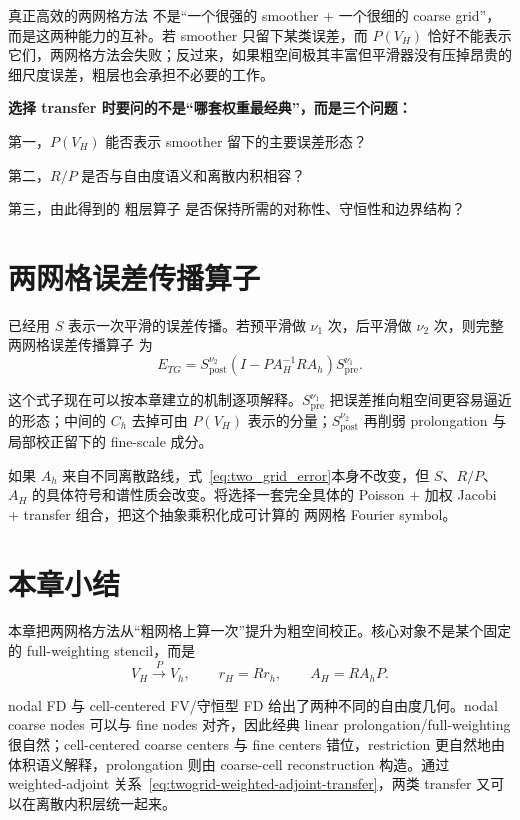 真正高效的两网格方法 不是“一个很强的 smoother + 一个很细的 coarse grid”，而是这两种能力的互补。若 smoother 只留下某类误差，而 $P(V_H)$ 恰好不能表示它们，两网格方法会失败；反过来，如果粗空间极其丰富但平滑器没有压掉昂贵的 细尺度误差，粗层也会承担不必要的工作。

\begin{keybox}
\textbf{选择 transfer 时要问的不是“哪套权重最经典”，而是三个问题：}

第一，$P(V_H)$ 能否表示 smoother 留下的主要误差形态？

第二，$R/P$ 是否与自由度语义和离散内积相容？

第三，由此得到的 粗层算子 是否保持所需的对称性、守恒性和边界结构？
\end{keybox}

\section{两网格误差传播算子}

已经用 $S$ 表示一次平滑的误差传播。若预平滑做 $\nu_1$ 次，后平滑做 $\nu_2$ 次，则完整两网格误差传播算子 为
\begin{equation}
E_{TG}
=S_{\mathrm{post}}^{\nu_2}
\left(I-PA_H^{-1}RA_h\right)
S_{\mathrm{pre}}^{\nu_1}.
\label{eq:two_grid_error}
\end{equation}

这个式子现在可以按本章建立的机制逐项解释。$S_{\mathrm{pre}}^{\nu_1}$ 把误差推向粗空间更容易逼近的形态；中间的 $C_h$ 去掉可由 $P(V_H)$ 表示的分量；$S_{\mathrm{post}}^{\nu_2}$ 再削弱 prolongation 与局部校正留下的 fine-scale 成分。

如果 $A_h$ 来自不同离散路线，式~\eqref{eq:two_grid_error}本身不改变，但 $S$、$R/P$、$A_H$ 的具体符号和谱性质会改变。将选择一套完全具体的 Poisson + 加权 Jacobi + transfer 组合，把这个抽象乘积化成可计算的 两网格 Fourier symbol。

\section{本章小结}

本章把两网格方法从“粗网格上算一次”提升为粗空间校正。核心对象不是某个固定的 full-weighting stencil，而是
\begin{equation}
V_H\xrightarrow{P}V_h,
\qquad
r_H=Rr_h,
\qquad
A_H=RA_hP.
\end{equation}

nodal FD 与 cell-centered FV/守恒型 FD 给出了两种不同的自由度几何。nodal coarse nodes 可以与 fine nodes 对齐，因此经典 linear prolongation/full-weighting 很自然；cell-centered coarse centers 与 fine centers 错位，restriction 更自然地由体积语义解释，prolongation 则由 coarse-cell reconstruction 构造。通过 weighted-adjoint 关系~\eqref{eq:twogrid-weighted-adjoint-transfer}，两类 transfer 又可以在离散内积层统一起来。

